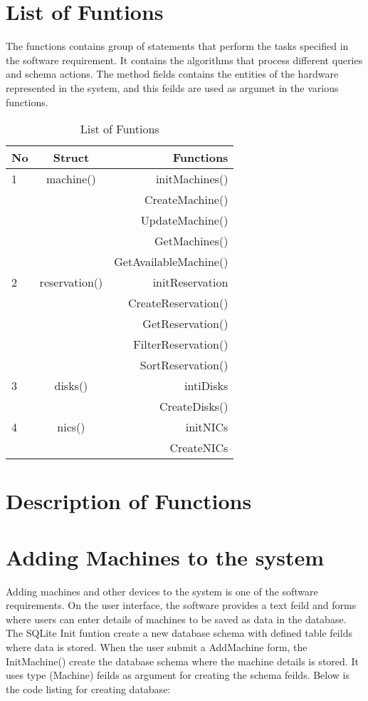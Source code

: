 \section{List of Funtions}
The functions contains group of statements that perform the tasks specified in the software requirement. It contains the algorithms that process different  queries and schema actions. The method fields contains the entities of the hardware represented in the system, and this feilds are used as argumet in the various functions. 
\begin{table}[h!]
  \centering
  \label{tab:table1}
  \begin{tabular}{l|c||r}
    No & Struct& Functions\\
    \hline
    1 &machine() &  initMachines()\\
      && CreateMachine()\\
      &&UpdateMachine()\\
      &&GetMachines()\\
      &&GetAvailableMachine()\\
     \hline
    2 &reservation() & initReservation\\
    && CreateReservation()\\
    && GetReservation()\\
    && FilterReservation()\\
    && SortReservation()\\
    \hline
    3 &disks() & intiDisks\\
    && CreateDisks()\\
    \hline
    4 &nics() & initNICs\\
    && CreateNICs
  \end{tabular}
  \caption{List of Funtions}
\end{table}

\pagebreak
\section{Description of Functions}
\section*{Adding Machines to the system}
Adding machines and other devices to the system is one of the software  requirements. On the user interface, the software provides a text feild and forms where users can enter details of machines to be saved as data in the database. The SQLite Init funtion create a new database schema with defined table feilds where data is stored. When the user submit a AddMachine form, the InitMachine() create the database schema where the machine details is stored. It uses type (Machine) feilds as argument for creating the schema feilds. Below is the code listing for creating database:

